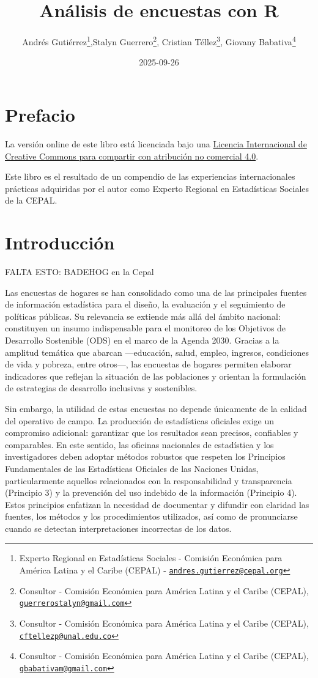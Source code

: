 \documentclass[
  spanish,
  12pt,
]{book}
\title{Análisis de encuestas con R}
\author{Andrés Gutiérrez\footnote{Experto Regional en Estadísticas Sociales - Comisión Económica para América Latina y el Caribe (CEPAL) - \href{mailto:andres.gutierrez@cepal.org}{\nolinkurl{andres.gutierrez@cepal.org}}},Stalyn Guerrero\footnote{Consultor - Comisión Económica para América Latina y el Caribe (CEPAL), \href{mailto:guerrerostalyn@gmail.com}{\nolinkurl{guerrerostalyn@gmail.com}}}, Cristian Téllez\footnote{Consultor - Comisión Económica para América Latina y el Caribe (CEPAL), \href{mailto:cftellezp@unal.edu.co}{\nolinkurl{cftellezp@unal.edu.co}}}, Giovany Babativa\footnote{Consultor - Comisión Económica para América Latina y el Caribe (CEPAL), \href{mailto:gbabativam@gmail.com}{\nolinkurl{gbabativam@gmail.com}}}}
\date{2025-09-26}
\begin{document}
\maketitle

{
\hypersetup{linkcolor=}
\setcounter{tocdepth}{1}
\tableofcontents
}
\listoffigures
\listoftables
\chapter*{Prefacio}\label{prefacio}

La versión online de este libro está licenciada bajo una \href{http://creativecommons.org/licenses/by-nc-sa/4.0/}{Licencia Internacional de Creative Commons para compartir con atribución no comercial 4.0}.

Este libro es el resultado de un compendio de las experiencias internacionales prácticas adquiridas por el autor como Experto Regional en Estadísticas Sociales de la CEPAL.

\chapter{Introducción}\label{introducciuxf3n}

FALTA ESTO: BADEHOG en la Cepal

Las encuestas de hogares se han consolidado como una de las principales fuentes de información estadística para el diseño, la evaluación y el seguimiento de políticas públicas. Su relevancia se extiende más allá del ámbito nacional: constituyen un insumo indispensable para el monitoreo de los Objetivos de Desarrollo Sostenible (ODS) en el marco de la Agenda 2030. Gracias a la amplitud temática que abarcan ---educación, salud, empleo, ingresos, condiciones de vida y pobreza, entre otros---, las encuestas de hogares permiten elaborar indicadores que reflejan la situación de las poblaciones y orientan la formulación de estrategias de desarrollo inclusivas y sostenibles.

Sin embargo, la utilidad de estas encuestas no depende únicamente de la calidad del operativo de campo. La producción de estadísticas oficiales exige un compromiso adicional: garantizar que los resultados sean precisos, confiables y comparables. En este sentido, las oficinas nacionales de estadística y los investigadores deben adoptar métodos robustos que respeten los Principios Fundamentales de las Estadísticas Oficiales de las Naciones Unidas, particularmente aquellos relacionados con la responsabilidad y transparencia (Principio 3) y la prevención del uso indebido de la información (Principio 4). Estos principios enfatizan la necesidad de documentar y difundir con claridad las fuentes, los métodos y los procedimientos utilizados, así como de pronunciarse cuando se detectan interpretaciones incorrectas de los datos.
\end{document}
